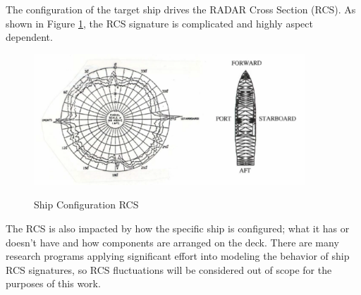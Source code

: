 The configuration of the target ship drives the RADAR Cross Section (RCS). As shown in Figure \ref{rmt_fig:1}, the RCS signature is complicated and highly aspect dependent. 
\begin{figure}[H]
  \begin{center}
\includegraphics[width=4in]{../media/multistatic/shipconfig.png}
  \end{center}
  \renewcommand{\baselinestretch}{1} \small\normalsize
  \begin{quote}
    \caption[Ship Configuration RCS]{Ship Configuration RCS\label{rmt_fig:1}}
  \end{quote}
\end{figure}
\renewcommand{\baselinestretch}{2} \small\normalsize
The RCS is also impacted by how the specific ship is configured; what it has or doesn't have and how components are arranged on the deck. There are many research programs applying significant effort into modeling the behavior of ship RCS signatures, so RCS fluctuations will be considered out of scope for the purposes of this work.

